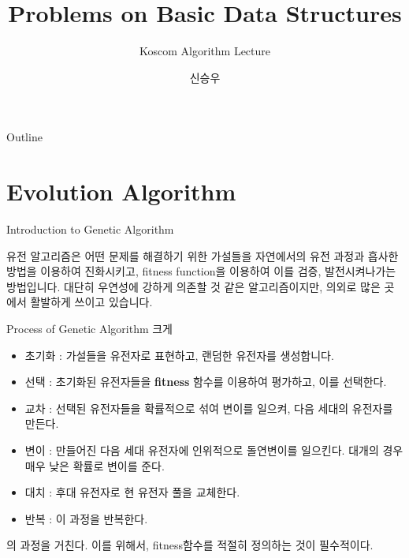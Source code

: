 \documentclass{beamer}
\title{Problems on Basic Data Structures}
\subtitle{Koscom Algorithm Lecture}
\author{신승우}
\begin{document}
\begin{frame}
  \titlepage
\end{frame}

\begin{frame}{Outline}
  \tableofcontents
\end{frame}






\section{Evolution Algorithm}

\begin{frame}{Introduction to Genetic Algorithm}

유전 알고리즘은 어떤 문제를 해결하기 위한 가설들을 자연에서의 유전 과정과 흡사한 방법을 이용하여 진화시키고, fitness function을 이용하여 이를 검증, 발전시켜나가는 방법입니다. 대단히 우연성에 강하게 의존할 것 같은 알고리즘이지만, 의외로 많은 곳에서 활발하게 쓰이고 있습니다. 
\end{frame}

\begin{frame}{Process of Genetic Algorithm}
크게 

\begin{itemize} 
\item 초기화 : 가설들을 유전자로 표현하고, 랜덤한 유전자를 생성합니다. 
\item 선택 : 초기화된 유전자들을 \textbf{fitness} 함수를 이용하여 평가하고, 이를 선택한다. 
\item 교차 : 선택된 유전자들을 확률적으로 섞여 변이를 일으켜, 다음 세대의 유전자를 만든다. 
\item 변이 : 만들어진 다음 세대 유전자에 인위적으로 돌연변이를 일으킨다. 대개의 경우 매우 낮은 확률로 변이를 준다. 
\item 대치 : 후대 유전자로 현 유전자 풀을 교체한다. 
\item 반복 : 이 과정을 반복한다. 
\end{itemize}

의 과정을 거친다. 이를 위해서, fitness함수를 적절히 정의하는 것이 필수적이다. 
\end{frame}
\end{document}
